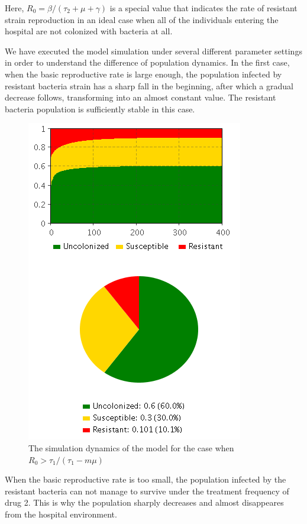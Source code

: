 Here, $R_0 = \beta/(\tau_2 + \mu + \gamma)$ is a special value that indicates the rate of resistant strain reproduction in an ideal case when all of the individuals entering the hospital are not colonized with bacteria at all.

We have executed the model simulation under several different parameter settings in order to understand the difference of population dynamics. In the first case, when the basic reproductive rate is large enough, the population infected by resistant bacteria strain has a sharp fall in the beginning, after which a gradual decrease follows, transforming into an almost constant value. The resistant bacteria population is sufficiently stable in this case.

\begin{figure}[H]
  \centering
  \includegraphics[height=0.7\textwidth]{img/screens/result/result1}
  \caption{The simulation dynamics of the model for the case when $R_0 > \tau_1/(\tau_1 - m \mu)$}
\end{figure}

When the basic reproductive rate is too small, the population infected by the resistant bacteria can not manage to survive under the treatment frequency of drug 2. This is why the population sharply decreases and almost disappeares from the hospital environment.

